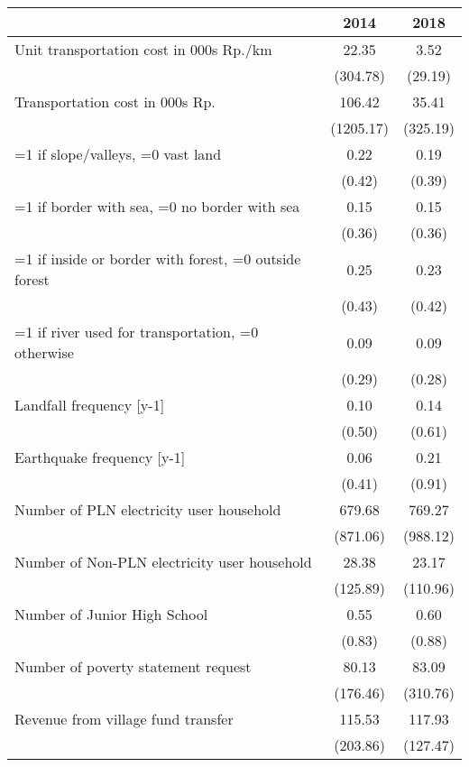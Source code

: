 \begin{tabular}{l*{2}{c}}
\hline\hline
                    &        2014&        2018\\
\hline
Unit transportation cost in 000s Rp./km&       22.35&        3.52\\
                    &    (304.78)&     (29.19)\\
[1em]
Transportation cost in 000s Rp.&      106.42&       35.41\\
                    &   (1205.17)&    (325.19)\\
[1em]
=1 if slope/valleys, =0 vast land&        0.22&        0.19\\
                    &      (0.42)&      (0.39)\\
[1em]
=1 if border with sea, =0 no border with sea&        0.15&        0.15\\
                    &      (0.36)&      (0.36)\\
[1em]
=1 if inside or border with forest, =0 outside forest&        0.25&        0.23\\
                    &      (0.43)&      (0.42)\\
[1em]
=1 if river used for transportation, =0 otherwise&        0.09&        0.09\\
                    &      (0.29)&      (0.28)\\
[1em]
Landfall frequency [y-1]&        0.10&        0.14\\
                    &      (0.50)&      (0.61)\\
[1em]
Earthquake frequency [y-1]&        0.06&        0.21\\
                    &      (0.41)&      (0.91)\\
[1em]
Number of PLN electricity user household&      679.68&      769.27\\
                    &    (871.06)&    (988.12)\\
[1em]
Number of Non-PLN electricity user household&       28.38&       23.17\\
                    &    (125.89)&    (110.96)\\
[1em]
Number of Junior High School&        0.55&        0.60\\
                    &      (0.83)&      (0.88)\\
[1em]
Number of poverty statement request&       80.13&       83.09\\
                    &    (176.46)&    (310.76)\\
[1em]
Revenue from village fund transfer&      115.53&      117.93\\
                    &    (203.86)&    (127.47)\\
\hline\hline
\end{tabular}

